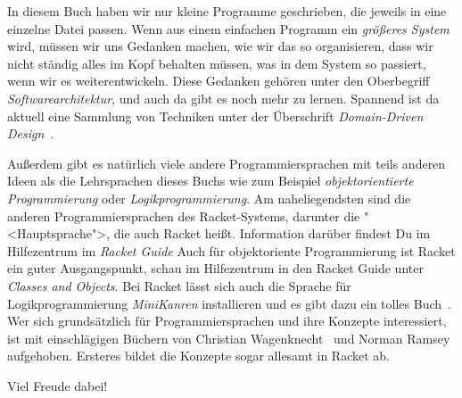 In diesem Buch haben wir nur kleine Programme geschrieben, die
  jeweils in eine einzelne Datei passen.  Wenn aus einem einfachen
  Programm ein \emph{größeres System} wird, müssen wir uns Gedanken machen,
  wie wir das so organisieren, dass wir nicht ständig alles im Kopf
  behalten müssen, was in dem System so passiert, wenn wir es
  weiterentwickeln.  Diese Gedanken gehören unter den Oberbegriff
  \textit{Softwarearchitektur}, und auch da
  gibt es noch mehr zu lernen.  Spannend ist da aktuell eine Sammlung
  von Techniken unter der Überschrift \textit{Domain-Driven
    Design}~\cite{Evans2004}.

Außerdem gibt es natürlich viele andere Programmiersprachen mit teils
anderen Ideen als die Lehrsprachen dieses Buchs wie zum Beispiel
\emph{objektorientierte Programmierung} oder \emph{Logikprogrammierung}.  Am
naheliegendsten sind die anderen Programmiersprachen des
Racket-Systems, darunter die "<Hauptsprache">, die auch Racket heißt.
Information darüber findest Du im Hilfezentrum im \textit{Racket
  Guide} Auch für objektoriente Programmierung ist Racket ein guter
Ausgangspunkt, schau im Hilfezentrum in den Racket Guide unter
\textit{Classes and Objects}.  Bei Racket lässt sich auch die Sprache
für Logikprogrammierung \textit{MiniKanren} installieren und es gibt
dazu ein tolles Buch~\cite{FriedmanEtAl2018}.  Wer sich grundsätzlich
für Programmiersprachen und ihre Konzepte interessiert, ist mit
einschlägigen Büchern von Christian Wagenknecht~\cite{Wagenknecht2016}
und Norman Ramsey~\cite{Ramsey2022} aufgehoben.  Ersteres bildet die
Konzepte sogar allesamt in Racket ab.

Viel Freude dabei!

